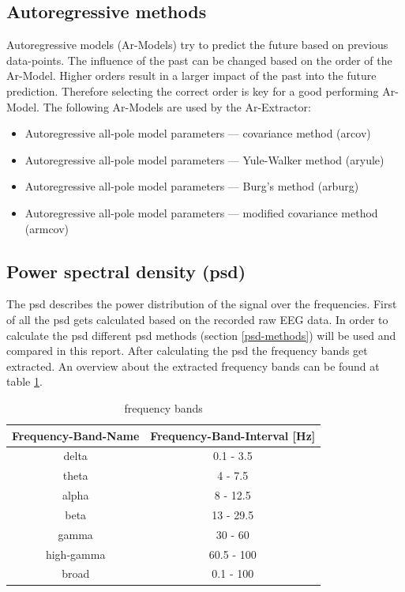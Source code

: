\documentclass{article}
\begin{document}
\subsection{Autoregressive methods}
Autoregressive models (Ar-Models) try to predict the future based on previous data-points. The influence of the past can be changed based on the order of the Ar-Model. Higher orders result in a larger impact of the past into the future prediction. Therefore selecting the correct order is key for a good performing Ar-Model. The following Ar-Models are used by the Ar-Extractor:
\begin{itemize}
    \item Autoregressive all-pole model parameters — covariance method (arcov) \parencite{arcov}
    \item Autoregressive all-pole model parameters — Yule-Walker method (aryule) \parencite{aryule}
    \item Autoregressive all-pole model parameters — Burg’s method (arburg) \parencite{arburg}
    \item Autoregressive all-pole model parameters — modified covariance method (armcov) \parencite{armcov}
\end{itemize}
\subsection{Power spectral density (psd)} \label{power-spectral-density}
The psd describes the power distribution of the signal over the frequencies. First of all the psd gets calculated based on the recorded raw EEG data. In order to calculate the psd different psd methods (section \ref{psd-methods}) will be used and compared in this report. After calculating the psd the frequency bands get extracted. An overview about the extracted frequency bands can be found at table \ref{tbl:frequency-bands}.
\begin{table}[H]
 \centering
 \begin{tabular}{|c|c|}
 \hline
   \textbf{Frequency-Band-Name}  & \textbf{Frequency-Band-Interval [Hz]} \\\hline
   delta            & 0.1 - 3.5             \\
   theta            & 4 - 7.5             \\
   alpha            & 8 - 12.5             \\
   beta             & 13 - 29.5 \\
   gamma            & 30 - 60 \\
   high-gamma       & 60.5 - 100 \\
   broad            & 0.1 - 100\\\hline
 \end{tabular}

 \caption{frequency bands}
 \label{tbl:frequency-bands}
\end{table}
\end{document}

